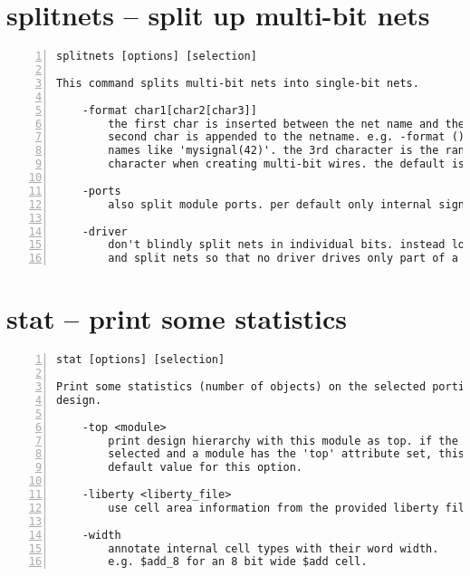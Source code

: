 \section{splitnets -- split up multi-bit nets}
\label{cmd:splitnets}
\begin{lstlisting}[numbers=left,frame=single]
    splitnets [options] [selection]

This command splits multi-bit nets into single-bit nets.

    -format char1[char2[char3]]
        the first char is inserted between the net name and the bit index, the
        second char is appended to the netname. e.g. -format () creates net
        names like 'mysignal(42)'. the 3rd character is the range separation
        character when creating multi-bit wires. the default is '[]:'.

    -ports
        also split module ports. per default only internal signals are split.

    -driver
        don't blindly split nets in individual bits. instead look at the driver
        and split nets so that no driver drives only part of a net.
\end{lstlisting}

\section{stat -- print some statistics}
\label{cmd:stat}
\begin{lstlisting}[numbers=left,frame=single]
    stat [options] [selection]

Print some statistics (number of objects) on the selected portion of the
design.

    -top <module>
        print design hierarchy with this module as top. if the design is fully
        selected and a module has the 'top' attribute set, this module is used
        default value for this option.

    -liberty <liberty_file>
        use cell area information from the provided liberty file

    -width
        annotate internal cell types with their word width.
        e.g. $add_8 for an 8 bit wide $add cell.
\end{lstlisting}

